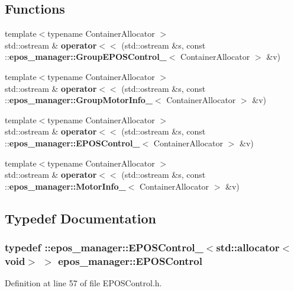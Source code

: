 \subsection*{\-Functions}
\begin{DoxyCompactItemize}
\item 
{\footnotesize template$<$typename Container\-Allocator $>$ }\\std\-::ostream \& {\bf operator$<$$<$} (std\-::ostream \&s, const \-::{\bf epos\-\_\-manager\-::\-Group\-E\-P\-O\-S\-Control\-\_\-}$<$ \-Container\-Allocator $>$ \&v)
\item 
{\footnotesize template$<$typename Container\-Allocator $>$ }\\std\-::ostream \& {\bf operator$<$$<$} (std\-::ostream \&s, const \-::{\bf epos\-\_\-manager\-::\-Group\-Motor\-Info\-\_\-}$<$ \-Container\-Allocator $>$ \&v)
\item 
{\footnotesize template$<$typename Container\-Allocator $>$ }\\std\-::ostream \& {\bf operator$<$$<$} (std\-::ostream \&s, const \-::{\bf epos\-\_\-manager\-::\-E\-P\-O\-S\-Control\-\_\-}$<$ \-Container\-Allocator $>$ \&v)
\item 
{\footnotesize template$<$typename Container\-Allocator $>$ }\\std\-::ostream \& {\bf operator$<$$<$} (std\-::ostream \&s, const \-::{\bf epos\-\_\-manager\-::\-Motor\-Info\-\_\-}$<$ \-Container\-Allocator $>$ \&v)
\end{DoxyCompactItemize}


\subsection{\-Typedef \-Documentation}
\subsubsection[{\-E\-P\-O\-S\-Control}]{\setlength{\rightskip}{0pt plus 5cm}typedef \-::{\bf epos\-\_\-manager\-::\-E\-P\-O\-S\-Control\-\_\-}$<$std\-::allocator$<$void$>$ $>$ {\bf epos\-\_\-manager\-::\-E\-P\-O\-S\-Control}}\label{namespaceepos__manager_a77121564adde496fb0434dd24d9ab43c}


\-Definition at line 57 of file \-E\-P\-O\-S\-Control.\-h.

